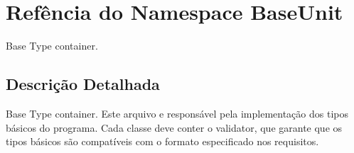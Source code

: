 \hypertarget{namespaceBaseUnit}{\section{Refência do Namespace Base\-Unit}
\label{d6/d57/namespaceBaseUnit}
}


Base Type container.  




\subsection{Descrição Detalhada}
Base Type container. Este arquivo e responsável pela implementação dos tipos básicos do programa. Cada classe deve conter o validator, que garante que os tipos básicos são compatíveis com o formato especificado nos requisitos. 